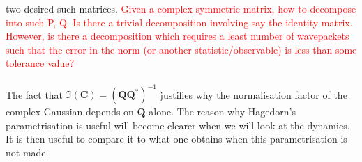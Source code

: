 two desired such matrices.
\textcolor{red}{Given a complex symmetric matrix, how to decompose into such 
P, Q. Is there a trivial decomposition involving say the identity matrix. However, 
is there a decomposition which requires a least number of wavepackets such that 
the error in the norm (or another statistic/observable) is less than some tolerance value?}
\\
\\
The fact that $\Im(\bm{C}) = (\bm{QQ}^{*})^{-1}$ justifies why the normalisation factor 
of the complex Gaussian depends on $\bm{Q}$ alone.
The reason why Hagedorn's parametrisation is useful will become clearer when 
we will look at the dynamics. It is then useful to compare it to what one obtains when 
this parametrisation is not made. 

